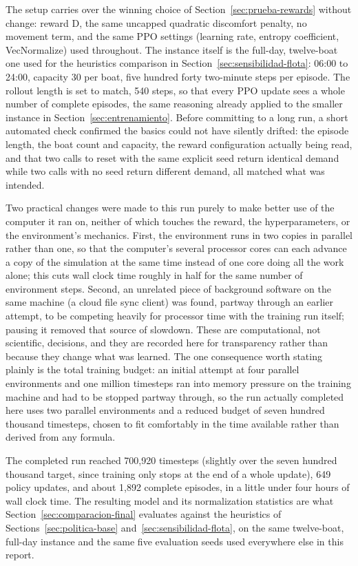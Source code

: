 \documentclass[11pt,a4paper]{article}
\begin{document}
The setup carries over the winning choice of Section~\ref{sec:prueba-rewards} without change: reward D, the same uncapped quadratic discomfort penalty, no movement term, and the same PPO settings (learning rate, entropy coefficient, VecNormalize) used throughout. The instance itself is the full-day, twelve-boat one used for the heuristics comparison in Section~\ref{sec:sensibilidad-flota}: 06:00 to 24:00, capacity 30 per boat, five hundred forty two-minute steps per episode. The rollout length is set to match, 540 steps, so that every PPO update sees a whole number of complete episodes, the same reasoning already applied to the smaller instance in Section~\ref{sec:entrenamiento}. Before committing to a long run, a short automated check confirmed the basics could not have silently drifted: the episode length, the boat count and capacity, the reward configuration actually being read, and that two calls to reset with the same explicit seed return identical demand while two calls with no seed return different demand, all matched what was intended.

Two practical changes were made to this run purely to make better use of the computer it ran on, neither of which touches the reward, the hyperparameters, or the environment's mechanics. First, the environment runs in two copies in parallel rather than one, so that the computer's several processor cores can each advance a copy of the simulation at the same time instead of one core doing all the work alone; this cuts wall clock time roughly in half for the same number of environment steps. Second, an unrelated piece of background software on the same machine (a cloud file sync client) was found, partway through an earlier attempt, to be competing heavily for processor time with the training run itself; pausing it removed that source of slowdown. These are computational, not scientific, decisions, and they are recorded here for transparency rather than because they change what was learned. The one consequence worth stating plainly is the total training budget: an initial attempt at four parallel environments and one million timesteps ran into memory pressure on the training machine and had to be stopped partway through, so the run actually completed here uses two parallel environments and a reduced budget of seven hundred thousand timesteps, chosen to fit comfortably in the time available rather than derived from any formula.

The completed run reached 700{,}920 timesteps (slightly over the seven hundred thousand target, since training only stops at the end of a whole update), 649 policy updates, and about 1{,}892 complete episodes, in a little under four hours of wall clock time. The resulting model and its normalization statistics are what Section~\ref{sec:comparacion-final} evaluates against the heuristics of Sections~\ref{sec:politica-base} and~\ref{sec:sensibilidad-flota}, on the same twelve-boat, full-day instance and the same five evaluation seeds used everywhere else in this report.
\end{document}
